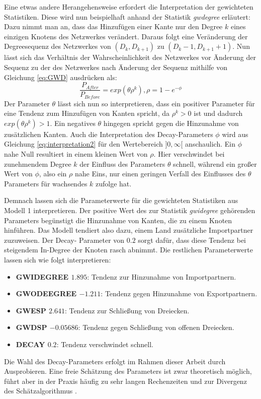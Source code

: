 \documentclass[a4paper,ngerman,oneside,titlepage,bibliography=totoc,11pt]{scrreprt}
\begin{document}
Eine etwas andere Herangehensweise erfordert die Interpretation der gewichteten Statistiken. Diese wird nun beispielhaft anhand der Statistik \emph{gwdegree} erläutert:
Dazu nimmt man an, dass das Hinzufügen einer Kante nur den Degree $k$ eines einzigen Knotens des Netzwerkes verändert. Daraus folgt eine Veränderung der Degreesequenz des Netzwerkes von $(D_k, D_{k+1})$ zu $(D_k-1, D_{k+1}+1)$. Nun lässt sich das Verhältnis der Wahrscheinlichkeit des Netzwerkes vor Änderung der Sequenz zu der des Netzwerkes nach Änderung der Sequenz mithilfe von Gleichung \ref{eq:GWD} ausdrücken als:
\begin{equation}
\frac{P_{After}}{P_{Before}} = exp(\theta\rho^k) , \rho = 1 - e^{-\phi}
\label{eq:interpretation2}
\end{equation}
Der Parameter $\theta$ lässt sich nun so interpretieren, dass ein positiver Parameter für eine Tendenz zum Hinzufügen von Kanten spricht, da $\rho^k>0$ ist und dadurch $exp(\theta\rho^k)>1$. Ein negatives $\theta$ hingegen spricht gegen die Hinzunahme von zusätzlichen Kanten.
Auch die Interpretation des Decay-Parameters $\phi$ wird aus Gleichung \ref{eq:interpretation2} für den Wertebereich $]0,\infty[$ anschaulich. Ein $\phi$ nahe Null resultiert in einem kleinen Wert von $\rho$. Hier verschwindet bei zunehmendem Degree $k$ der Einfluss des Parameters $\theta$ schnell, während ein großer Wert von $\phi$, also ein $\rho$ nahe Eins, nur einen geringen Verfall des Einflusses des $\theta$ Parameters für wachsendes $k$ zufolge hat.

Demnach lassen sich die Parameterwerte für die gewichteten Statistiken aus Modell 1 interpretieren. Der positive Wert des zur Statistik \emph{gwidegree} gehörenden Parameters begünstigt die Hinzunahme von Kanten, die zu einem Knoten hinführen. Das Modell tendiert also dazu, einem Land zusätzliche Importpartner zuzuweisen. Der Decay- Parameter von $0.2$ sorgt dafür, dass diese Tendenz bei steigendem In-Degree der Knoten rasch abnimmt. Die restlichen Parameterwerte lassen sich wie folgt interpretieren: 
	\begin{itemize}
		\item {\textbf{GWIDEGREE $1.895$}: Tendenz zur Hinzunahme von Importpartnern.}
		\item {\textbf{GWODEEGREE $-1.211$}: Tendenz gegen Hinzunahme von Exportpartnern.}
		\item {\textbf{GWESP $2.641$}: Tendenz zur Schließung von Dreiecken.}
		\item {\textbf{GWDSP $-0.05686$}: Tendenz gegen Schließung von offenen Dreiecken.}
		\item {\textbf{DECAY $0.2$}: Tendenz verschwindet schnell.}
	\end{itemize}
	Die Wahl des Decay-Parameters erfolgt im Rahmen dieser Arbeit durch Ausprobieren. Eine freie Schätzung des Parameters ist zwar theoretisch möglich, führt aber in der Praxis häufig zu sehr langen Rechenzeiten und zur Divergenz des Schätzalgorithmus \citep{goodreau2008statnet}.
	
\end{document}

